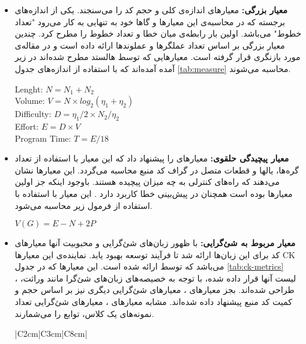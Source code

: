 \begin{itemize}
	\item \textbf{معیار بزرگی: }
معیارهای  اندازه‌ی کلی و حجم کد را می‌سنجند. یکی از اندازه‌های برجسته که در محاسبه‌ی این معیارها و گاها خود به تنهایی به کار می‌رود "تعداد خطوط" می‌باشد. اولین بار 
 \cite{akiyama1971example}  
رابطه‌ی میان خطا و تعداد خطوط را مطرح کرد. 
 \cite{halstead1977elements} 
 چندین معیار بزرگی بر اساس  تعداد عملگرها و عملوند‌ها ارائه داده است و در مقاله‌ی \cite{pawade2016exploring} مورد بازنگری قرار گرفته است. معیارهایی که توسط هالستد مطرح شده‌اند در زیر آمده آمده‌اند که با استفاده از اندازه‌های جدول \ref{tab:measure} محاسبه می‌شوند. 
 \begin{latin}
 \baselineskip=1.1cm
Lenght: $N = N_1 + N_2$ \\
Volume: $V = N \times log_2 (\eta_1 + \eta_2)$\\
Difficulty: $D = \eta_1/2 \times N_2/\eta_2$ \\
Effort: $E = D \times V$ \\
Program Time: $T = E/18$ \\
 \end{latin}
 
 
\item \textbf{معیار پیچیدگی حلقوی: }
 معیارهای 
را پیشنهاد داد که این معیار با استفاده از تعداد گره‌ها، یالها و قطعات متصل در گراف   کد منبع محاسبه می‌گردد\cite{mccabe1976complexity}. این معیارها نشان می‌دهند که راه‌های کنترلی به چه میزان پیچیده هستند. باوجود اینکه جز اولین معیارها بوده است همچنان در پیش‌بینی خطا کاربرد دارد \cite{malhotra2014comparative}. این معیار با استفاده با استفاده از فرمول زیر محاسبه می‌شود. 
\begin{latin}
$V(G) = E - N + 2P $
\end{latin}


\item \textbf{معیار مربوط به شئ‌گرایی: }
با ظهور زبان‌های شئ‌گرایی و محبوبیت آنها معیارهای کد  برای این زبان‌ها ارائه شد تا فرآیند توسعه بهبود یابد. نماینده‌ی این معیارها CK می‌باشد که توسط 
 ارائه شده است\cite{chidamber1994metrics}. این معیارها  که در جدول  \ref{tab:ck-metrics} لیست آنها قرار داده شده، با توجه به خصیصه‌های زبان‌های شئ‌گرا مانند وراثت، ،  طراحی شده‌اند. بجز معیارهای  ، معیارهای شئ‌گرایی دیگری نیز بر اساس حجم و کمیت کد منبع پیشنهاد داده شده‌اند. مشابه معیارهای ، معیارهای شئ‌گرایی تعداد نمونه‌های یک کلاس، توابع را می‌شمارند. \\
 \begin{table}[H] 
 	\renewcommand*{\arraystretch}{1.5}	
 	\centering \caption{معیارهای CK }
 	\label{tab:ck-metrics}
 	\begin{tabular}{|C{2cm}|C{3cm}|C{8cm}|}
 		

\end{tabular}
\end{table}
\end{itemize}
